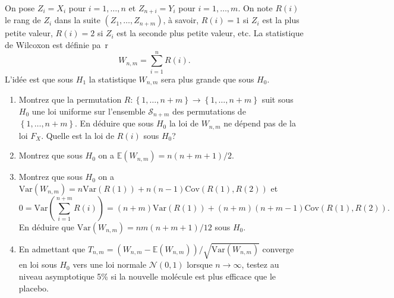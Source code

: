 \documentclass[a4paper,11pt,fleqn]{article}
\newcommand{\E}{\ensuremath{\mathbb{E}}}
\newcommand{\1}{\ensuremath{\mathbbm{1}}}
\newcommand{\pa}[1]{\left(#1\right)}
\newcommand{\ac}[1]{\left\{#1\right\}}
\begin{document}
On pose $Z_{i}=X_{i}$ pour $i=1,\ldots,n$ et $Z_{n+i}=Y_{i}$ pour $i=1,\ldots,m$. On note $R(i)$ le rang de $Z_{i}$ dans la suite $(Z_{1},\ldots,Z_{n+m})$, \`a savoir, $R(i)=1$ si $Z_{i}$ est la plus petite valeur, $R(i)=2$ si $Z_{i}$ est la seconde plus petite valeur, etc. La statistique de Wilcoxon est d\'efinie pa\
r
$$W_{n,m}=\sum_{i=1}^nR(i).$$
L'id\'ee est que sous $H_{1}$ la statistique $W_{n,m}$  sera plus grande que sous $H_{0}$.
\begin{enumerate}
\item Montrez que la permutation $R:\ac{1,\ldots,n+m}\to \ac{1,\ldots,n+m}$ suit sous $H_{0}$ une loi uniforme sur l'ensemble $\mathcal{S}_{n+m}$ des permutations de  $\ac{1,\ldots,n+m}$. En d\'eduire que sous $H_{0}$ la loi de $W_{n,m}$  ne d\'epend pas de la loi $F_{X}$. Quelle est la loi de $R(i)$ sous $H_{0}$?
\item Montrez que sous $H_{0}$ on a $\E(W_{n,m})=n(n+m+1)/2$.
\item Montrez que  sous $H_{0}$ on a  $\textrm{Var}(W_{n,m})=n\textrm{Var}(R(1))+n(n-1)\textrm{Cov}(R(1),R(2))$ et
$$0=\textrm{Var}\pa{\sum_{i=1}^{n+m}R(i)}=(n+m)\textrm{Var}(R(1))+(n+m)(n+m-1)\textrm{Cov}(R(1),R(2)).$$
En d\'eduire que $\textrm{Var}(W_{n,m})=nm(n+m+1)/12$  sous $H_{0}$.
\item En admettant que $T_{n,m}=(W_{n,m}-\E(W_{n,m}))/\sqrt{\textrm{Var}(W_{n,m})}$ converge en loi  sous $H_{0}$ vers une loi normale  $\mathcal{N}(0,1)$   lorsque $n\to\infty$, testez au niveau asymptotique 5\% si la nouvelle mol\'ecule est plus efficace que le placebo.
\end{enumerate}
\end{document}
